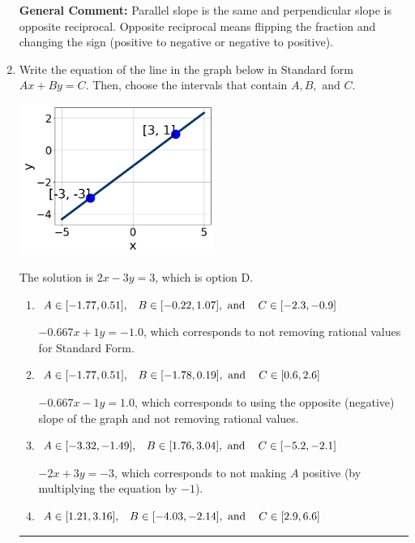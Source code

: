 \documentclass{extbook}[14pt]
\newcommand{\litem}[1]{\item #1

\rule{\textwidth}{0.4pt}}
\begin{document}
\begin{enumerate}
{\textbf{General Comment:} Parallel slope is the same and perpendicular slope is opposite reciprocal. Opposite reciprocal means flipping the fraction and changing the sign (positive to negative or negative to positive).
}
\litem{
Write the equation of the line in the graph below in Standard form $Ax+By=C$. Then, choose the intervals that contain $A, B, \text{ and } C$.

\begin{center}
    \includegraphics[width=0.5\textwidth]{../Figures/linearGraphToStandardCopyB.png}
\end{center}


The solution is \( 2x - 3y = 3 \), which is option D.\begin{enumerate}[label=\Alph*.]
\item \( A \in [-1.77, 0.51], \hspace{3mm} B \in [-0.22, 1.07], \text{ and } \hspace{3mm} C \in [-2.3, -0.9] \)

 $-0.667x + 1y = -1.0$, which corresponds to not removing rational values for Standard Form.
\item \( A \in [-1.77, 0.51], \hspace{3mm} B \in [-1.78, 0.19], \text{ and } \hspace{3mm} C \in [0.6, 2.6] \)

 $-0.667x - 1y = 1.0$, which corresponds to using the opposite (negative) slope of the graph and not removing rational values.
\item \( A \in [-3.32, -1.49], \hspace{3mm} B \in [1.76, 3.04], \text{ and } \hspace{3mm} C \in [-5.2, -2.1] \)

 $-2x + 3y = -3$, which corresponds to not making $A$ positive (by multiplying the equation by $-1$).
\item \( A \in [1.21, 3.16], \hspace{3mm} B \in [-4.03, -2.14], \text{ and } \hspace{3mm} C \in [2.9, 6.6] \)


\end{enumerate}}
\end{enumerate}
\end{document}
